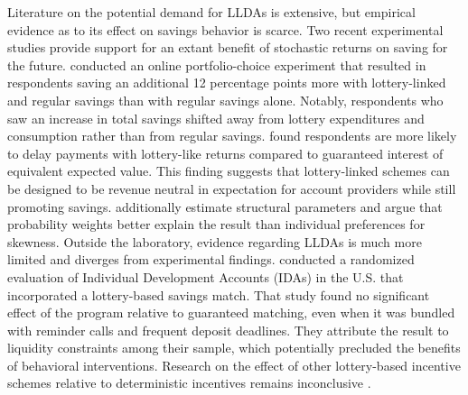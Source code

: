 \documentclass[10pt]{article}
\begin{document}
	Literature on the potential demand for LLDAs is extensive, but empirical evidence as to its effect on savings behavior is scarce. Two recent experimental studies provide support for an extant benefit of stochastic returns on saving for the future.  conducted an online portfolio-choice experiment that resulted in respondents saving an additional 12 percentage points more with lottery-linked and regular savings than with regular savings alone. Notably, respondents who saw an increase in total savings shifted away from lottery expenditures and consumption rather than from regular savings.  found respondents are more likely to delay payments with lottery-like returns compared to guaranteed interest of equivalent expected value. This finding suggests that lottery-linked schemes can be designed to be revenue neutral in expectation for account providers while still promoting savings.  additionally estimate structural parameters and argue that probability weights better explain the result than individual preferences for skewness. Outside the laboratory, evidence regarding LLDAs is much more limited and diverges from experimental findings.  conducted a randomized evaluation of Individual Development Accounts (IDAs) in the U.S. that incorporated a lottery-based savings match. That study found no significant effect of the program relative to guaranteed matching, even when it was bundled with reminder calls and frequent deposit deadlines. They attribute the result to liquidity constraints among their sample, which potentially precluded the benefits of behavioral interventions. Research on the effect of other lottery-based incentive schemes relative to deterministic incentives remains inconclusive .
\end{document}
